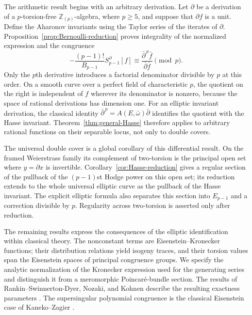 \documentclass[11pt]{amsart}
\theoremstyle{definition}
\theoremstyle{remark}
\numberwithin{equation}{section}
\begin{document}
The arithmetic result begins with an arbitrary derivation. Let
$\partial$ be a derivation of a $p$-torsion-free $\mathbb Z_{(p)}$-algebra,
where $p\geq5$, and suppose that $\partial f$ is a unit. Define the
Aharonov invariants using the Taylor series of the iterates of
$\partial$. Proposition~\ref{prop:Bernoulli-reduction} proves integrality
of the normalized expression and the congruence
\begin{equation}\label{eq:intro-general-reduction}
-\frac{(p-1)!}{B_{p-1}}S_{p-1}^\partial[f]
\equiv\frac{\bar\partial^{\,p}\bar f}{\bar\partial\bar f}\pmod p.
\end{equation}
Only the $p$th derivative introduces a factorial denominator divisible
by $p$ at this order. On a smooth curve over a perfect field of
characteristic $p$, the quotient on the right is independent of $f$
wherever its denominator is nonzero, because the space of rational
derivations has dimension one. For an elliptic
invariant derivation, the classical identity
$\bar\partial^{\,p}=A(E,\bar\omega)\bar\partial$
\cite[\S2.0]{katz} identifies the quotient with the Hasse invariant.
Theorem~\ref{thm:general-Hasse} therefore applies to arbitrary rational
functions on their separable locus, not only to double covers.

The universal double cover is a global corollary of this differential
result. On the framed Weierstrass family its complement of two-torsion
is the principal open set where $y=\partial x$ is invertible.
Corollary~\ref{cor:Hasse-reduction} gives a regular section of the
pullback of the $(p-1)$st Hodge power on this open set; its reduction
extends to the whole universal elliptic curve as the pullback of the
Hasse invariant. The explicit elliptic formula also separates this
section into $E_{p-1}$ and a correction divisible by $p$. Regularity
across two-torsion is asserted only after reduction.

The remaining results express the consequences of the elliptic
identification within classical theory. The nonconstant terms are
Eisenstein--Kronecker functions; their distribution relations yield
isogeny traces, and their torsion values span the Eisenstein spaces of
principal congruence groups. We specify the analytic normalization of
the Kronecker expression used for the generating series and distinguish
it from a meromorphic Poincar\'e-bundle section. The results of
Rankin--Swinnerton-Dyer, Nozaki, and Kohnen describe the resulting
exactness parameters \cite{rankin-swinnerton-dyer,nozaki,kohnen-trans}.
The supersingular polynomial congruence is the classical Eisenstein
case of Kaneko--Zagier \cite[Theorem~1]{kz-ss}.
\end{document}
